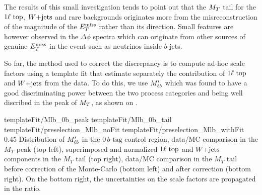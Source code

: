     The results of this small investigation tends to point out that the $M_T$ tail for
    the $1\ell~\text{top}$, $\text{$W$+jets}$ and rare backgrounds originates more from the
    misreconstruction of the magnitude of the $E_T^\text{miss}$ rather than its direction. Small
    features are however observed in the $\Delta \phi$ spectra which can originate from
    other sources of genuine $E_T^\text{miss}$ in the event such as neutrinos inside $b$ jets.

    So far, the method used to correct the discrepancy is to compute ad-hoc scale factors
    using a template fit that estimate separately the contribution of $1\ell~\text{top}$ and
    $\text{$W$+jets}$ from the data. To do this, we use $M'_{\ell b}$ which was found to have a good
    discriminating power between the two process categories and being well discribed in
    the peak of $M_T$, as shown on .

                          {templateFit/Mlb_0b_peak}
                          {templateFit/Mlb_0b_tail}
                          {templateFit/preselection_Mlb_noFit}
                          {templateFit/preselection_Mlb_withFit}
                          {0.45}
                          {Distribution of $M'_{\ell b}$ in the $0\, b\text{-tag}$ control region, data/MC comparison in the $M_T$ peak (top left), superimposed and normalized $1\ell~\text{top}$ and $\text{$W$+jets}$ components in the $M_T$ tail (top right), data/MC comparison in the $M_T$ tail before correction of the Monte-Carlo (bottom left) and after correction (bottom right). On the bottom right, the uncertainties on the scale factors are propagated in the ratio.}

